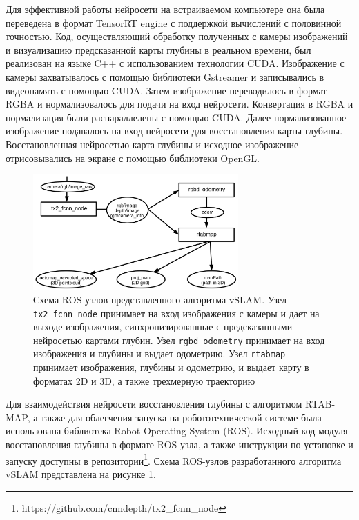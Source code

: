 \documentclass{mipt-thesis-ms}
\begin{document}
	Для эффективной работы нейросети на встраиваемом компьютере она была переведена в формат TensorRT engine с поддержкой вычислений с половинной точностью. Код, осуществляющий обработку полученных с камеры изображений и визуализацию предсказанной карты глубины в реальном времени, был реализован на языке C++ с использованием технологии CUDA. Изображение с камеры захватывалось с помощью библиотеки Gstreamer и записывались в видеопамять с помощью CUDA. Затем изображение переводилось в формат RGBA и нормализовалось для подачи на вход нейросети. Конвертация в RGBA и нормализация были распараллелены с помощью CUDA. Далее нормализованное изображение подавалось на вход нейросети для восстановления карты глубины. Восстановленная нейросетью карта глубины и исходное изображение отрисовывались на экране с помощью библиотеки OpenGL.
	
	\begin{figure}
		\centering
		\includegraphics[width=0.7\textwidth]{img/rosnode_scheme.png}
		\caption{Схема ROS-узлов представленного алгоритма vSLAM. Узел \texttt{tx2\_fcnn\_node} принимает на вход изображения с камеры и дает на выходе изображения, синхронизированные с предсказанными нейросетью картами глубин. Узел \texttt{rgbd\_odometry} принимает на вход изображения и глубины и выдает одометрию. Узел \texttt{rtabmap} принимает изображения, глубины и одометрию, и выдает карту в форматах 2D и 3D, а также трехмерную траекторию}
		\label{figure_rosnode}
	\end{figure}
	
	Для взаимодействия нейросети восстановления глубины с алгоритмом RTAB-MAP, а также для облегчения запуска на робототехнической системе была использована библиотека Robot Operating System (ROS)\cite{koubaa2017robot}. Исходный код модуля восстановления глубины в формате ROS-узла, а также инструкции по установке и запуску доступны в репозитории\footnote{https://github.com/cnndepth/tx2\_fcnn\_node}. Схема ROS-узлов разработанного алгоритма vSLAM представлена на рисунке \ref{figure_rosnode}.
	
\end{document}
